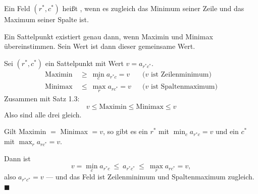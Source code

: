 \begin{definition}
Ein Feld $(r^{*},c^{*})$ heißt , wenn es zugleich das Minimum seiner Zeile und das Maximum seiner Spalte ist.
\end{definition}

\begin{merksatz}
Ein Sattelpunkt existiert genau dann, wenn Maximin und Minimax übereinstimmen. Sein Wert ist dann dieser gemeinsame Wert.

Sei $(r^{*},c^{*})$ ein Sattelpunkt mit Wert $v = a_{r^{*}c^{*}}$.
\begin{align*}
\text{Maximin} &\ \ge\ \min_c a_{r^{*}c} = v && \text{($v$ ist Zeilenminimum)}\\
\text{Minimax} &\ \le\ \max_r a_{rc^{*}} = v && \text{($v$ ist Spaltenmaximum)}
\end{align*}
Zusammen mit Satz 1.3:
\[ v \le \text{Maximin} \le \text{Minimax} \le v \]
Also sind alle drei gleich. \checkmark

Gilt Maximin $=$ Minimax $= v$, so gibt es ein $r^{*}$ mit $\min_c a_{r^{*}c} = v$ und ein $c^{*}$ mit $\max_r a_{rc^{*}} = v$.

Dann ist
\[ v = \min_c a_{r^{*}c} \ \le\ a_{r^{*}c^{*}} \ \le\ \max_r a_{rc^{*}} = v , \]
also $a_{r^{*}c^{*}} = v$ --- und das Feld ist Zeilenminimum und Spaltenmaximum zugleich. $\blacksquare$
\end{merksatz}

